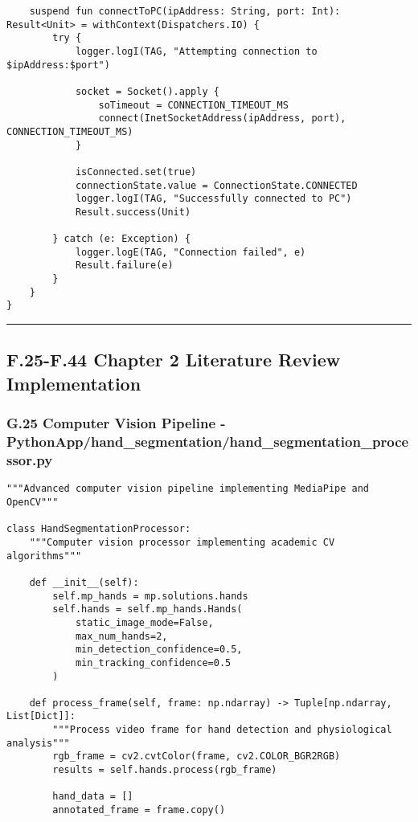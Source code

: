 \documentclass[12pt,a4paper]{article}
\begin{document}
{{\begin{verbatim}
    suspend fun connectToPC(ipAddress: String, port: Int): Result<Unit> = withContext(Dispatchers.IO) {
        try {
            logger.logI(TAG, "Attempting connection to $ipAddress:$port")
            
            socket = Socket().apply {
                soTimeout = CONNECTION_TIMEOUT_MS
                connect(InetSocketAddress(ipAddress, port), CONNECTION_TIMEOUT_MS)
            }
            
            isConnected.set(true)
            connectionState.value = ConnectionState.CONNECTED
            logger.logI(TAG, "Successfully connected to PC")
            Result.success(Unit)
            
        } catch (e: Exception) {
            logger.logE(TAG, "Connection failed", e)
            Result.failure(e)
        }
    }
}
\end{verbatim}

\hrule

\subsection{F.25-F.44 Chapter 2 Literature Review Implementation}

\subsubsection{G.25 Computer Vision Pipeline - PythonApp/hand_segmentation/hand_segmentation_processor.py}

\begin{verbatim}
"""Advanced computer vision pipeline implementing MediaPipe and OpenCV"""

class HandSegmentationProcessor:
    """Computer vision processor implementing academic CV algorithms"""
    
    def __init__(self):
        self.mp_hands = mp.solutions.hands
        self.hands = self.mp_hands.Hands(
            static_image_mode=False,
            max_num_hands=2,
            min_detection_confidence=0.5,
            min_tracking_confidence=0.5
        )
        
    def process_frame(self, frame: np.ndarray) -> Tuple[np.ndarray, List[Dict]]:
        """Process video frame for hand detection and physiological analysis"""
        rgb_frame = cv2.cvtColor(frame, cv2.COLOR_BGR2RGB)
        results = self.hands.process(rgb_frame)
        
        hand_data = []
        annotated_frame = frame.copy()
        

\end{verbatim}}}
\end{document}
